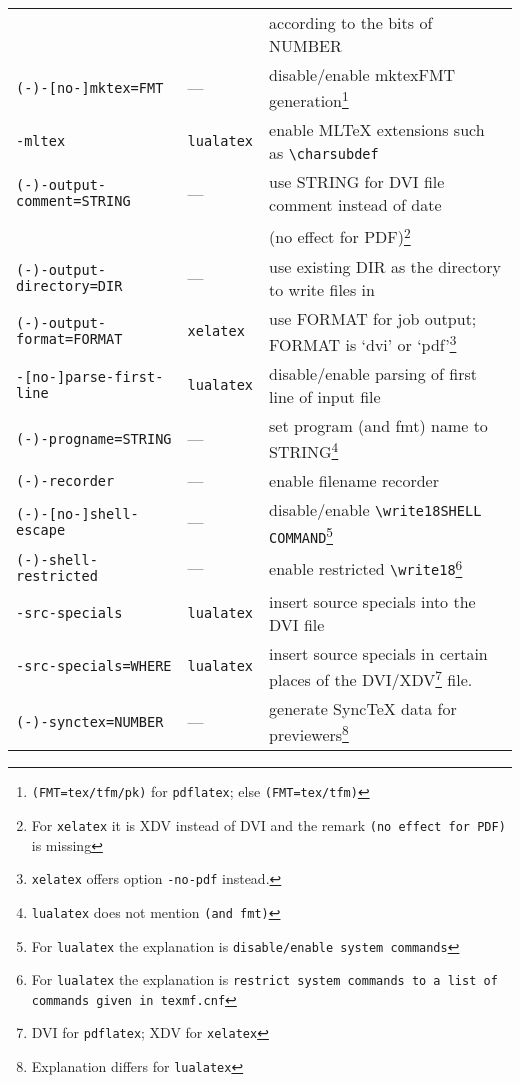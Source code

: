 \documentclass{article}
\newcommand{\pdflatex}{\texttt{pdflatex}}
\newcommand{\lualatex}{\texttt{lualatex}}
\newcommand{\xelatex}{\texttt{xelatex}}
\begin{document}
{\begin{longtable}{|lll|}
                                   &             & according to the bits of NUMBER \\
\texttt{(-)-[no-]mktex=FMT}        & ---         & disable/enable mktexFMT generation\footnote%
{\texttt{(FMT=tex/tfm/pk)} for \pdflatex; else \texttt{(FMT=tex/tfm)}} \\
\texttt{-mltex}                    & \lualatex{} & enable MLTeX extensions such as \texttt{\textbackslash{}charsubdef} \\
\texttt{(-)-output-comment=STRING} & ---         & use STRING for DVI file comment instead of date \\
                                   &             & (no effect for PDF)\footnote%
{For \xelatex{} it is XDV instead of DVI and the remark \texttt{(no effect for PDF)} is missing} \\
\texttt{(-)-output-directory=DIR}  & ---         & use existing DIR as the directory to write files in \\
\texttt{(-)-output-format=FORMAT}     & \xelatex{}  & use FORMAT for job output; FORMAT is `dvi' or `pdf'\footnote%
{\xelatex{} offers option \texttt{-no-pdf} instead. } \\
\texttt{-[no-]parse-first-line}    & \lualatex{} & disable/enable parsing of first line of input file \\
\texttt{(-)-progname=STRING}       & ---         & set program (and fmt) name to STRING\footnote%
{\lualatex{} does not mention \texttt{(and fmt)}} \\
\texttt{(-)-recorder}              & ---         & enable filename recorder \\
\texttt{(-)-[no-]shell-escape}     & ---         & disable/enable \texttt{\textbackslash{}write18{SHELL COMMAND}}\footnote%
{For \lualatex{} the explanation is \texttt{disable/enable system commands}} \\
\texttt{(-)-shell-restricted}      & ---         & enable restricted \texttt{\textbackslash{}write18}\footnote%
{For \lualatex{} the explanation is \texttt{restrict system commands to a list of commands given in texmf.cnf}} \\
\texttt{-src-specials}             & \lualatex{} & insert source specials into the DVI file \\
\texttt{-src-specials=WHERE}       & \lualatex{} & insert source specials in certain places of
                          the DVI/XDV\footnote{DVI for \pdflatex; XDV for \xelatex} file. \\
\texttt{(-)-synctex=NUMBER}        & ---         & generate SyncTeX data for previewers\footnote%
{Explanation differs for \lualatex} \\ 
                        

           
\end{longtable}
} %
\end{document}
